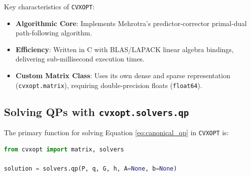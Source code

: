 \documentclass[11pt,a4paper]{article}
\begin{document}
Key characteristics of \texttt{CVXOPT}:
\begin{itemize}
    \item \textbf{Algorithmic Core}: Implements Mehrotra's predictor-corrector primal-dual path-following algorithm.
    \item \textbf{Efficiency}: Written in C with BLAS/LAPACK linear algebra bindings, delivering sub-millisecond execution times.
    \item \textbf{Custom Matrix Class}: Uses its own dense and sparse representation (\texttt{cvxopt.matrix}), requiring double-precision floats (\texttt{float64}).
\end{itemize}

\subsection{Solving QPs with \texttt{cvxopt.solvers.qp}}
The primary function for solving Equation \eqref{eq:canonical_qp} in \texttt{CVXOPT} is:
\begin{lstlisting}[language=Python]
from cvxopt import matrix, solvers

solution = solvers.qp(P, q, G, h, A=None, b=None)
\end{lstlisting}
\end{document}
